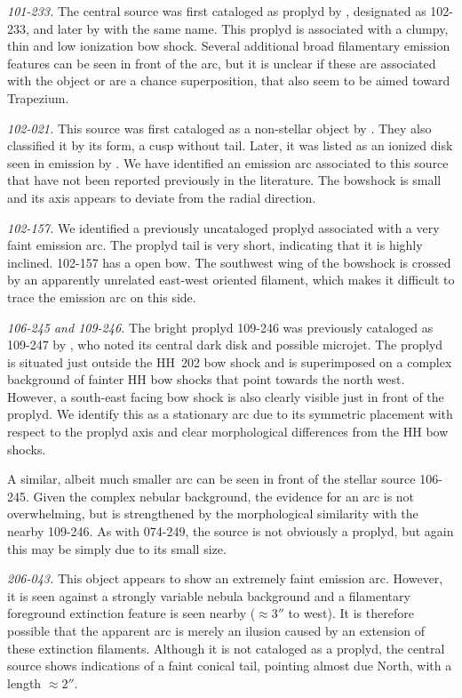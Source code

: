 \documentclass[apj, twocolumn]{aastex63}
\begin{document}
\textit{101-233.} The central source was first cataloged
as proplyd by \citet{ODell:1996a}, designated as 102-233,
and later by \citet{Ricci:2008a} with the same name. This
proplyd is associated with a clumpy, thin and low ionization
bow shock. Several additional broad filamentary emission
features can be seen in front of the arc, but it is unclear
if these are associated with the object or are a chance
superposition, that also seem to be aimed toward Trapezium. 

\textit{102-021.} This source was first cataloged as a non-stellar
object by \citet{ODell:1996a}. They also classified it by its form,
a cusp without tail. Later, it was listed as an ionized disk seen
in emission by \citet{Ricci:2008a}. We have identified an emission
arc associated to this source that have not been reported previously
in the literature. The  bowshock is small and its axis appears to
deviate from the radial direction. 

\textit{102-157.} We identified a previously uncataloged
proplyd associated with a very faint emission arc. The proplyd
tail is very short, indicating that it is highly inclined.
102-157 has a open bow. The southwest wing of the bowshock
is crossed by an apparently unrelated east-west oriented
filament, which makes it difficult to trace the emission
arc on this side.


\textit{106-245 and 109-246.} The bright proplyd 109-246
\citep{Ricci:2008a} was previously cataloged as 109-247 by
\citet{Bally:2000a}, who noted its central dark disk and
possible microjet.  The proplyd is situated just outside
the HH~202 bow shock and is superimposed on a complex
background of fainter HH bow shocks that point towards
the north west.  However, a south-east facing bow shock
is also clearly visible just in front of
the proplyd.  We identify this as a stationary arc due to its
symmetric placement with respect to the proplyd axis and clear
morphological differences from the HH bow shocks.

A similar, albeit much smaller arc can be seen in front of the
stellar source 106-245.  Given the complex nebular background,
the evidence for an arc is not overwhelming, but is strengthened
by the morphological similarity with the nearby 109-246.  As
with 074-249, the source is not obviously a proplyd, but again
this may be simply due to its small size.    


\textit{206-043.} This object appears to show an extremely faint
emission arc.  However, it is seen against a strongly variable nebula
background and a filamentary foreground extinction feature is seen
nearby (\(\approx 3''\) to west).  It is therefore possible that
the apparent arc is merely an ilusion caused by an extension of these
extinction filaments.  Although it is not cataloged as a proplyd, the
central source shows indications of a faint conical tail, pointing
almost due North, with a length \(\approx 2''\). 
\end{document}
